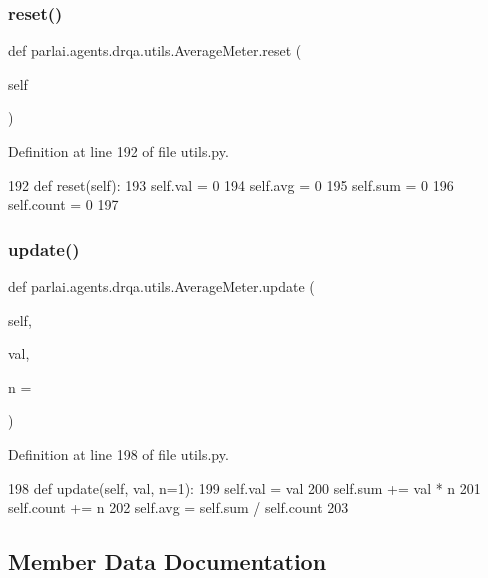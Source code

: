 \subsubsection{\texorpdfstring{reset()}{reset()}}
{\footnotesize\ttfamily def parlai.\+agents.\+drqa.\+utils.\+Average\+Meter.\+reset (\begin{DoxyParamCaption}\item[{}]{self }\end{DoxyParamCaption})}



Definition at line 192 of file utils.\+py.


\begin{DoxyCode}
192     \textcolor{keyword}{def }reset(self):
193         self.val = 0
194         self.avg = 0
195         self.sum = 0
196         self.count = 0
197 
\end{DoxyCode}
\mbox{\label{classparlai_1_1agents_1_1drqa_1_1utils_1_1AverageMeter_a5a66f2a884034fcdf004468a980d1318}} 
\subsubsection{\texorpdfstring{update()}{update()}}
{\footnotesize\ttfamily def parlai.\+agents.\+drqa.\+utils.\+Average\+Meter.\+update (\begin{DoxyParamCaption}\item[{}]{self,  }\item[{}]{val,  }\item[{}]{n = {} }\end{DoxyParamCaption})}



Definition at line 198 of file utils.\+py.


\begin{DoxyCode}
198     \textcolor{keyword}{def }update(self, val, n=1):
199         self.val = val
200         self.sum += val * n
201         self.count += n
202         self.avg = self.sum / self.count
203 \end{DoxyCode}


\subsection{Member Data Documentation}
\mbox{\label{classparlai_1_1agents_1_1drqa_1_1utils_1_1AverageMeter_aee254ce04bba670cb5839d0d8b602906}} 
